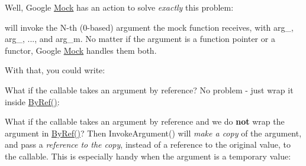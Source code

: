 Well, Google \mbox{\hyperlink{class_mock}{Mock}} has an action to solve {\itshape exactly} this problem\+:


\begin{DoxyCode}{0}
\end{DoxyCode}


will invoke the {\ttfamily N}-\/th (0-\/based) argument the mock function receives, with {\ttfamily arg\+\_}, {\ttfamily arg\+\_}, ..., and {\ttfamily arg\+\_\+m}. No matter if the argument is a function pointer or a functor, Google \mbox{\hyperlink{class_mock}{Mock}} handles them both.

With that, you could write\+:


\begin{DoxyCode}{0}
\end{DoxyCode}


What if the callable takes an argument by reference? No problem -\/ just wrap it inside {\ttfamily \mbox{\hyperlink{namespacetesting_a1f94a81e042d7c40c8359c1471fbb61e}{By\+Ref()}}}\+:


\begin{DoxyCode}{0}
\DoxyCodeLine{}
\end{DoxyCode}


What if the callable takes an argument by reference and we do {\bfseries{not}} wrap the argument in {\ttfamily \mbox{\hyperlink{namespacetesting_a1f94a81e042d7c40c8359c1471fbb61e}{By\+Ref()}}}? Then {\ttfamily Invoke\+Argument()} will {\itshape make a copy} of the argument, and pass a {\itshape reference to the copy}, instead of a reference to the original value, to the callable. This is especially handy when the argument is a temporary value\+:


